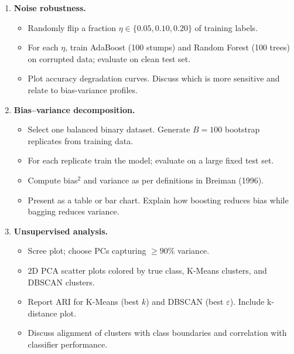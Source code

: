 \documentclass[11pt,a4paper]{article}
\begin{document}
\begin{enumerate}[topsep=2pt,itemsep=4pt,leftmargin=2.2em]
    \begin{itemize}
      \item Set $n\_\text{estimators}=100$ for both ensembles.
      \item 5-fold cross-validation. For each fold compute accuracy, macro F1, and AUC-ROC.
      \item Report mean $\pm$ standard deviation for: single tree, AdaBoost, Random Forest, and \texttt{sklearn.ensemble.RandomForestClassifier} (as reference). Use box plots or tables.
    \end{itemize}
  \item \textbf{Noise robustness.}
    \begin{itemize}
      \item Randomly flip a fraction $\eta \in \{0.05, 0.10, 0.20\}$ of training labels.
      \item For each $\eta$, train AdaBoost (100 stumps) and Random Forest (100 trees) on corrupted data; evaluate on clean test set.
      \item Plot accuracy degradation curves. Discuss which is more sensitive and relate to bias-variance profiles.
    \end{itemize}
  \item \textbf{Bias--variance decomposition.}
    \begin{itemize}
      \item Select one balanced binary dataset. Generate $B=100$ bootstrap replicates from training data.
      \item For each replicate train the model; evaluate on a large fixed test set.
      \item Compute bias$^2$ and variance as per definitions in Breiman (1996).
      \item Present as a table or bar chart. Explain how boosting reduces bias while bagging reduces variance.
    \end{itemize}
  \item \textbf{Unsupervised analysis.}
    \begin{itemize}
      \item Scree plot; choose PCs capturing $\ge 90\%$ variance.
      \item 2D PCA scatter plots colored by true class, K-Means clusters, and DBSCAN clusters.
      \item Report ARI for K-Means (best $k$) and DBSCAN (best $\varepsilon$). Include k-distance plot.
      \item Discuss alignment of clusters with class boundaries and correlation with classifier performance.
    \end{itemize}
\end{enumerate}
\end{document}
